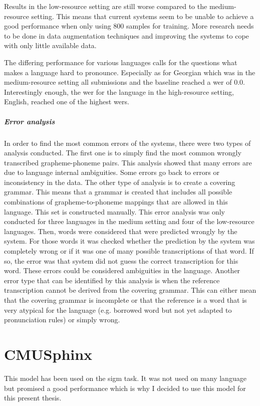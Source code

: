 Results in the low-resource setting are still worse compared to the medium-resource setting. This means that current systems seem to be unable to achieve a good performance when only using 800 samples for training. More research needs to be done in data augmentation techniques and improving the systems to cope with only little available data.

The differing performance for various languages calls for the questions what makes a language hard to pronounce. Especially as for Georgian which was in the medium-resource setting all submissions and the baseline reached a \ac{wer} of $0.0$. Interestingly enough, the \ac{wer} for the language in the high-resource setting, English, reached one of the highest \ac{wer}s.

  
\subparagraph{Error analysis}
In order to find the most common errors of the systems, there were two types of analysis conducted. The first one is to simply find the most common wrongly transcribed grapheme-phoneme pairs. This analysis showed that many errors are due to language internal ambiguities. Some errors go back to errors or inconsistency in the data. 
The other type of analysis is to create a covering grammar. This means that a grammar is created that includes all possible combinations of grapheme-to-phoneme mappings that are allowed in this language. This set is constructed manually. This error analysis was only conducted for three languages in the medium setting and four of the low-resource languages. Then, words were considered that were predicted wrongly by the system. For those words it was checked whether the prediction by the system was completely wrong or if it was one of many possible transcriptions of that word. If so, the error was that system did not guess the correct transcription for this word. These errors could be considered ambiguities in the language. Another error type that can be identified by this analysis is when the reference transcription cannot be derived from the covering grammar. This can either mean that the covering grammar is incomplete or that the reference is a word that is very atypical for the language (e.g. borrowed word but not yet adapted to pronunciation rules) or simply wrong. 

\section{CMUSphinx}
This model has been used on the \ac{sigm} task. It was not used on many language but promised a good performance which is why I decided to use this model for this present thesis. 


